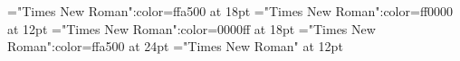 \documentclass[a4paper]{article}
\begin{document}
 
\pagestyle{plain} 
\font\acmain="Times New Roman":color=ffa500 at 18pt
\font\bmain="Times New Roman":color=ff0000 at 12pt
\font\amain="Times New Roman":color=0000ff at 18pt
\font\abcmain="Times New Roman":color=ffa500 at 24pt
\font\main="Times New Roman" at 12pt
\pagestyle{fancy} 






\end{document}
